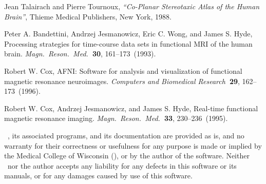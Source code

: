 
\newcommand{\bit}[5]{{\rm #1}{\rm #2}{\it #3}{\bf #4}{\rm, #5}.}

\begin{thebibliography}{99}\vspace*{-2ex}

   \bit{Jean Talairach and Pierre Tournoux, }{}
       {``Co-Planar Stereotaxic Atlas of the Human Brain''}{}
       {Thieme Medical Publishers, New York, 1988}

   \bit{Peter A. Bandettini, Andrzej Jesmanowicz, Eric C. Wong, and James S. Hyde, }
      {Processing strategies for time-course data sets in functional MRI
        of the human brain. }
      {Magn.\ Reson.\ Med.}{~30}{161--173~(1993)}

    \bit{Robert W. Cox, }
        {AFNI: Software for analysis and visualization
         of functional magnetic resonance neuroimages. }
        {Computers and Biomedical Research}{~29}{162--173~(1996)}

   \bit{Robert W. Cox, Andrzej Jesmanowicz, and James S. Hyde, }
       {Real-time functional magnetic resonance imaging. }
       {Magn.\ Reson.\ Med.}{~33}{230--236~(1995)}

\end{thebibliography}
\newpage
\small
\vspace*{0pt plus 1fill}
\setlength{\parindent}{0em}
\setlength{\parskip}{0.5ex}
\setlength{\oddsidemargin}{0in}
\setlength{\textwidth}{6.6in}

\MCW$\!$~\afni, its associated programs, and its documentation are provided
as is, and no warranty for their correctness or usefulness for any
purpose is made or implied by the Medical College of Wisconsin (\MCW),
or by the author of the software.  Neither \MCW\ nor the author
accepts any liability for any
defects in this software or its manuals, or for any damages caused by use of this
software.

